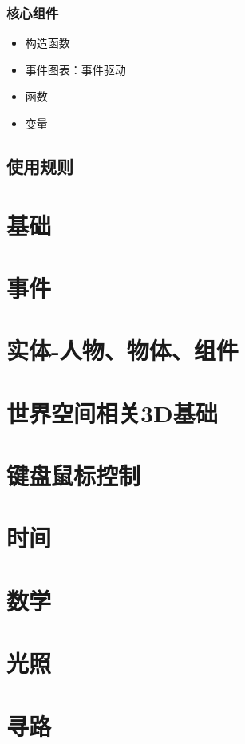 \documentclass[UTF8,a4paper,12pt]{ctexbook}
\begin{document}
		
		\subsection{核心组件}
			\begin{itemize}
				\item 构造函数 
				\item 事件图表：事件驱动
				\item 函数
				\item 变量
			\end{itemize}
	\section{使用规则}
	
	

\chapter{基础}
		
\chapter{事件}

\chapter{实体-人物、物体、组件}
		
\chapter{世界空间相关3D基础}

\chapter{键盘鼠标控制}

\chapter{时间}

\chapter{数学}
	
\chapter{光照}
	
\chapter{寻路}
	
\end{document}
